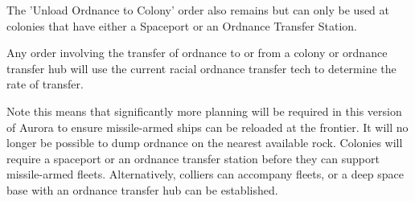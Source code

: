 \documentclass[../../Aurora C# unofficial manual.tex]{subfiles}
\begin{document}
	The 'Unload Ordnance to Colony' order also remains but can only be used at colonies that have either a Spaceport or an Ordnance Transfer Station.
	
	Any order involving the transfer of ordnance to or from a colony or ordnance transfer hub will use the current racial ordnance transfer tech to determine the rate of transfer.
	
	Note this means that significantly more planning will be required in this version of Aurora to ensure missile-armed ships can be reloaded at the frontier. It will no longer be possible to dump ordnance on the nearest available rock. Colonies will require a spaceport or an ordnance transfer station before they can support missile-armed fleets. Alternatively, colliers can accompany fleets, or a deep space base with an ordnance transfer hub can be established.
\end{document}
